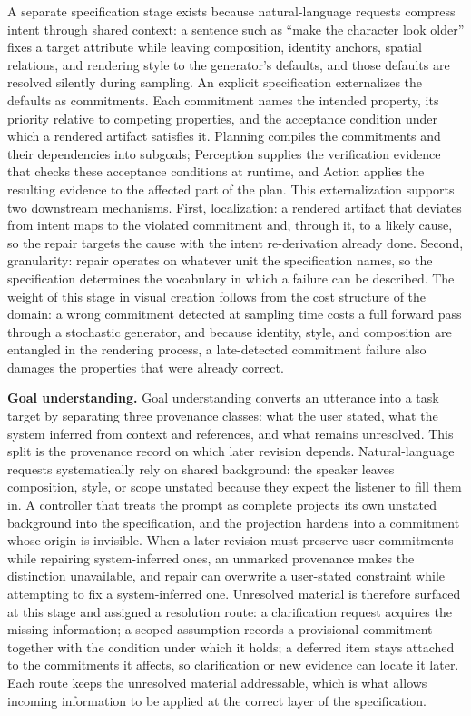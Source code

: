 A separate specification stage exists because natural-language requests compress intent through shared context: a sentence such as ``make the character look older'' fixes a target attribute while leaving composition, identity anchors, spatial relations, and rendering style to the generator's defaults, and those defaults are resolved silently during sampling. An explicit specification externalizes the defaults as commitments. Each commitment names the intended property, its priority relative to competing properties, and the acceptance condition under which a rendered artifact satisfies it. Planning compiles the commitments and their dependencies into subgoals; Perception supplies the verification evidence that checks these acceptance conditions at runtime, and Action applies the resulting evidence to the affected part of the plan. This externalization supports two downstream mechanisms. First, localization: a rendered artifact that deviates from intent maps to the violated commitment and, through it, to a likely cause, so the repair targets the cause with the intent re-derivation already done. Second, granularity: repair operates on whatever unit the specification names, so the specification determines the vocabulary in which a failure can be described. The weight of this stage in visual creation follows from the cost structure of the domain: a wrong commitment detected at sampling time costs a full forward pass through a stochastic generator, and because identity, style, and composition are entangled in the rendering process, a late-detected commitment failure also damages the properties that were already correct.

\textbf{Goal understanding.} Goal understanding converts an utterance into a task target by separating three provenance classes: what the user stated, what the system inferred from context and references, and what remains unresolved. This split is the provenance record on which later revision depends. Natural-language requests systematically rely on shared background: the speaker leaves composition, style, or scope unstated because they expect the listener to fill them in. A controller that treats the prompt as complete projects its own unstated background into the specification, and the projection hardens into a commitment whose origin is invisible. When a later revision must preserve user commitments while repairing system-inferred ones, an unmarked provenance makes the distinction unavailable, and repair can overwrite a user-stated constraint while attempting to fix a system-inferred one. Unresolved material is therefore surfaced at this stage and assigned a resolution route: a clarification request acquires the missing information; a scoped assumption records a provisional commitment together with the condition under which it holds; a deferred item stays attached to the commitments it affects, so clarification or new evidence can locate it later. Each route keeps the unresolved material addressable, which is what allows incoming information to be applied at the correct layer of the specification.

